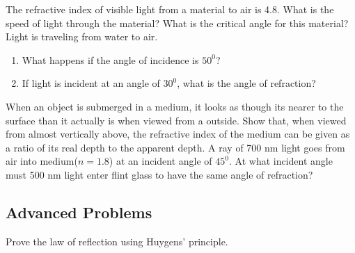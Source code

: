 \documentclass[11pt,addpoints]{exam}
\begin{document}
	\begin{questions}
		\question The refractive index of visible light from a material to air is 4.8. What is the speed of light through the material? What is the critical angle for this material?
		\question Light is traveling from water to air.
		\begin{enumerate}[label=(\alph*)]
			\item What happens if the angle of incidence is $50^0$?
			\item If light is incident at an angle of $30^0$, what is the angle of refraction?
		\end{enumerate}
		\question When an object is submerged in a medium, it looks as though its nearer to the surface than it actually is when viewed from a outside. Show that, when viewed from almost vertically above, the refractive index of the medium can be given as a ratio of its real depth to the apparent depth.
		\question A ray of 700 nm light goes from air into medium($n=1.8$) at an incident angle of $45^0$. At what incident angle must 500 nm light enter flint glass to have the same angle of refraction? 
		\subsection*{Advanced Problems}
		\question Prove the law of reflection using Huygens' principle.
	\end{questions}		
\end{document}

